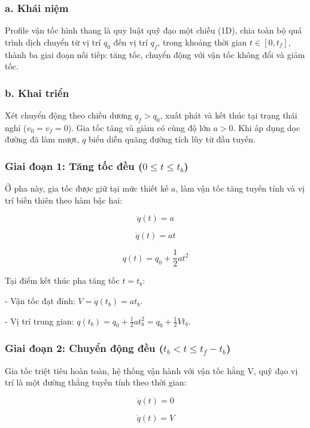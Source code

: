 \documentclass[12pt,a4paper,oneside]{report}
\begin{document}
\subsubsection*{a. Khái niệm}

Profile vận tốc hình thang là quy luật quỹ đạo một chiều (1D), chia toàn bộ quá trình dịch chuyển từ vị trí \(q_{0}\) đến vị trí \(q_{f}\), trong khoảng thời gian \(t\in \left[ 0,t_{f} \right]\), thành ba giai đoạn nối tiếp: tăng tốc, chuyển động với vận tốc không đổi và giảm tốc.

\subsubsection*{b. Khai triển}

Xét chuyển động theo chiều dương \(q_f>q_0\), xuất phát và kết thúc tại trạng thái nghỉ (\(v_0=v_f=0\)). Gia tốc tăng và giảm có cùng độ lớn \(a>0\). Khi áp dụng dọc đường đã làm mượt, \(q\) biểu diễn quãng đường tích lũy từ đầu tuyến.

\subsubsection*{Giai đoạn 1: Tăng tốc đều (\(0\leq t\leq t_{b}\))}

Ở pha này, gia tốc được giữ tại mức thiết kế \(a\), làm vận tốc tăng tuyến tính và vị trí biến thiên theo hàm bậc hai:

\[
\ddot{q}\left( t \right)=a
\]

\[
\dot{q}\left( t \right)=at
\]

\[
q\left( t \right)=q_{0}+\frac{1}{2}at^{2}
\]

Tại điểm kết thúc pha tăng tốc \(t=t_{b}\):

- Vận tốc đạt đỉnh: \(V=\dot{q}\left( t_{b} \right)=at_{b}\).

- Vị trí trung gian: \(q\left( t_{b} \right)=q_{0}+\frac{1}{2}at_{b}^{2}=q_{0}+\frac{1}{2}Vt_{b}\).

\subsubsection*{Giai đoạn 2: Chuyển động đều (\(t_{b}<t\leq t_{f}-t_{b}\))}

Gia tốc triệt tiêu hoàn toàn, hệ thống vận hành với vận tốc hằng V, quỹ đạo vị trí là một đường thẳng tuyến tính theo thời gian:

\[
\ddot{q}\left( t \right)=0
\]

\[
\dot{q}\left( t \right)=V
\]
\end{document}
